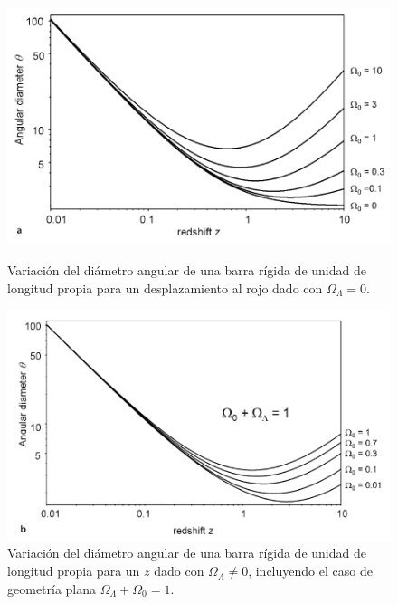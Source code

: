 \documentclass[11pt]{article}
\begin{document}
{    \begin{figure}[H]
        \begin{minipage}[b]{0.42\linewidth}
        \centering
            \includegraphics[scale=0.40]{angular_diameter78a_pp235Malcolm.png}
            \caption{\footnotesize{Variación del diámetro angular de una barra rígida de unidad de longitud propia para un desplazamiento al rojo dado con $\Omega_{\Lambda}=0$.}}
    \end{minipage}
        \hspace{0.5cm}
    \begin{minipage}[b]{0.45\linewidth}
        \centering
            \includegraphics[scale=0.40]{angular_diameter78b_pp235Malcolm.png}
            
            \caption{\footnotesize{Variación del diámetro angular de una barra rígida de unidad de longitud propia para un $z$ dado con $\Omega_{\Lambda} \neq 0$, incluyendo el caso de geometría plana $\Omega_{\Lambda} + \Omega_0 =1$. }}
    \end{minipage}
\end{figure}
    
}
\end{document}

